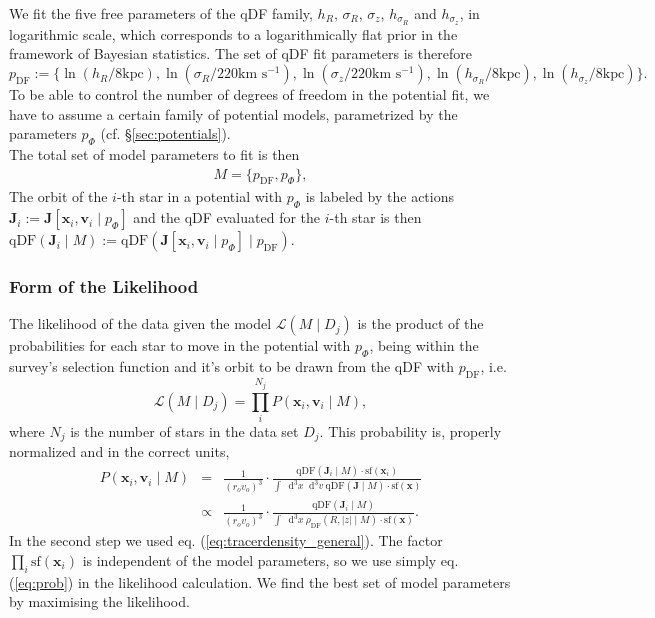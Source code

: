 \documentclass[12pt,preprint]{aastex}
\newcommand{\vect}[1]{\boldsymbol{#1}} %
\newcommand*\Diff[1]{\mathop{}\!\mathrm{d^#1}}
\begin{document}
We fit the five free parameters of the qDF family, $h_R$, $\sigma_R$, $\sigma_z$, $h_{\sigma_R}$ and $h_{\sigma_z}$, in logarithmic scale, which corresponds to a logarithmically flat prior in the framework of Bayesian statistics. The set of qDF fit parameters is therefore 
\begin{equation*}
p_\text{DF} := \{ \ln \left(h_R/8\text{kpc}\right), \ln \left(\sigma_R/220\text{km s$^{-1}$}\right), \ln \left(\sigma_z/220\text{km s$^{-1}$}\right), \ln \left(h_{\sigma_R}/8\text{kpc}\right), \ln \left(h_{\sigma_z}/8\text{kpc}\right)\} .
\end{equation*}
To be able to control the number of degrees of freedom in the potential fit, we have to assume a certain family of potential models, parametrized by the parameters $p_\Phi$ (cf. \S\ref{sec:potentials}). 
\\The total set of model parameters to fit is then
\begin{eqnarray*}
M =\{ p_\text{DF} , p_\Phi \},
\end{eqnarray*}
The orbit of the $i$-th star in a potential with $p_\Phi$ is labeled by the actions $\vect{J}_i := \vect{J}[\vect{x}_i,\vect{v}_i\mid p_{\Phi}]$ and the qDF evaluated for the $i$-th star is then $\text{qDF}(\vect{J}_i \mid M) := \text{qDF}(\vect{J}[\vect{x}_i,\vect{v}_i\mid p_{\Phi}] \mid p_\text{DF})$.

\subsubsection{Form of the Likelihood} 

The likelihood of the data given the model $\mathscr{L}(M \mid D_j)$ is the product of the probabilities for each star to move in the potential with $p_\Phi$, being within the survey's selection function and it's orbit to be drawn from the qDF with $p_\text{DF}$, i.e. 
\begin{equation}
\mathscr{L}(M \mid D_j) = \prod_i^{N_j} P(\vect{x}_i,\vect{v}_i \mid M), \label{eq:likelihood}
\end{equation}
where $N_j$ is the number of stars in the data set $D_j$. This probability is, properly normalized and in the correct units,
\begin{eqnarray}
P(\vect{x}_i,\vect{v}_i \mid M) &=& \frac{1}{\left(r_o v_o\right)^3} \cdot \frac{\text{qDF}(\vect{J}_i \mid M) \cdot \text{sf}(\vect{x}_i)}{\int \Diff 3 x \Diff 3 v \  \text{qDF}(\vect{J} \mid M) \cdot \text{sf}(\vect{x})}\nonumber\\
&\propto& \frac{1}{\left(r_o v_o\right)^3} \cdot \frac{\text{qDF}(\vect{J}_i \mid M)}{\int \Diff 3 x \  \rho_\text{DF}(R,|z| \mid M) \cdot \text{sf}(\vect{x})}. \label{eq:prob}
\end{eqnarray}
In the second step we used eq. (\ref{eq:tracerdensity_general}). The factor $\prod_i\text{sf}(\vect{x}_i)$ is independent of the model parameters, so we use simply eq. (\ref{eq:prob}) in the likelihood calculation. We find the best set of model parameters by maximising the likelihood. 
\end{document}
